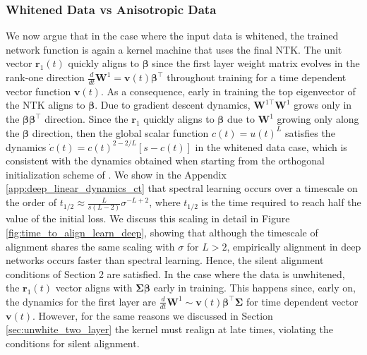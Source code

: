 \documentclass{article} %
\begin{document}
\subsubsection{Whitened Data vs Anisotropic Data}\label{sec:white_vs_unwhite}

We now argue that in the case where the input data is whitened, the trained network function is again a kernel machine that uses the final NTK. The unit vector $\bm r_1(t)$ quickly aligns to $\bm\beta$ since the first layer weight matrix evolves in the rank-one direction $\frac{d}{dt} \bm W^{1} = \bm v(t) \bm \beta^\top$ throughout training for a time dependent vector function $\bm v(t)$. As a consequence, early in training the top eigenvector of the NTK aligns to $\bm\beta$. Due to gradient descent dynamics,  $\bm W^{1 \top} \bm W^1$ grows only in the $\bm\beta \bm\beta^\top$ direction. Since the $\bm r_1$ quickly aligns to $\bm\beta$ due to $\bm W^1$ growing only along the $\bm\beta$ direction, then the global scalar function $c(t) = u(t)^L$ satisfies the dynamics $\dot{c}(t)= c(t)^{2-2/L} \left[ s- c(t) \right]$ in the whitened data case, which is consistent with the dynamics obtained when starting from the orthogonal initialization scheme of \citet{Saxe14exactsolutions}. We show in the Appendix \ref{app:deep_linear_dynamics_ct} that spectral learning occurs over a timescale on the order of $t_{1/2} \approx \frac{L}{s (L-2)} \sigma^{-L+2}$, where $t_{1/2}$ is the time required to reach half the value of the initial loss. We discuss this scaling in detail in Figure \ref{fig:time_to_align_learn_deep}, showing that although the timescale of alignment shares the same scaling with $\sigma$ for $L > 2$, empirically alignment in deep networks occurs faster than spectral learning. Hence, the silent alignment conditions of Section 2 are satisfied. In the case where the data is unwhitened, the $\bm r_1(t)$ vector aligns with $\bm\Sigma \bm \beta$ early in training. This happens since, early on, the dynamics for the first layer are $\frac{d}{dt} \bm W^1 \sim \bm v(t) \bm\beta^\top \bm\Sigma$ for time dependent vector $\bm v(t)$. However, for the same reasons we discussed in Section \ref{sec:unwhite_two_layer} the kernel must realign at late times, violating the conditions for silent alignment. 
\end{document}
